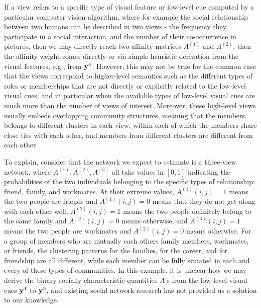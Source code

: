 If a view refers to a specific type of visual feature or low-level cue computed by a particular computer vision algorithm, where for example the social relationship between two humans can be described in two views - the frequency they participate in a social interaction, and the number of their co-occurrence in pictures, then we may directly reach two affinity matrices $A^{(1)}$ and $A^{(2)}$, then the affinity weight comes directly or via simple heuristic derivation from the visual features, e.g., from ${\bf y}^4$.  However, this may not be true for the common case that the views correspond to higher-level semantics such as the different types of roles or memberships\cite{AiroldiBFX08,Kim12} that are not directly or explicitly related to the low-level visual cues, and in particular when the available types of low-level visual cues are much more than the number of views of interest.  Moreover, these high-level views usually embeds overlapping community structures, meaning that the members belongs to different clusters in each view, within each of which the members share close ties with each other, and members from different clusters are different from each other. 

To explain, consider that the network we expect to estimate is a three-view network, where $A^{(1)}, A^{(2)}, A^{(3)}$ all take values in $[0,1]$ indicating the probabilities of the two individuals belonging to the specific types of relationship: friend, family, and workmates. At their extreme values, $A^{(1)}(i,j)=1$ means the two people are friends and $A^{(1)}(i,j)=0$ means that they do not get along with each other well,  $A^{(2)}(i,j)=1$ means the two people definitely belong to the same family and $A^{(2)}(i,j)=0$ means otherwise, and $A^{(3)}(i,j)=1$ means the two people are workmates and $A^{(2)}(i,j)=0$ means otherwise. For a group of members who are mutually each others family members, workmates, or friends, the clustering patterns for the families, for the career, and for friendship are all different, while each member can be fully situated in each and every of these types of communities. In this example, it is unclear how we may derive the binary socially-characteristic quantities $A$'s from the low-level visual cues ${\bf y}^1$ to ${\bf y}^5$, and existing social network research has not provided us a solution to our knowledge.

